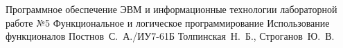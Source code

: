 \documentclass{bmstu}
\begin{document}
	
	{Программное обеспечение ЭВМ и информационные технологии}
	{лабораторной работе №5}
	{Функциональное и логическое программирование}
	{Использование функционалов}
	{}
	{Постнов~С.~А./ИУ7-61Б}
	{Толпинская~Н.~Б., Строганов~Ю.~В.}
	
	\maketableofcontents
	
	
	
\end{document}
